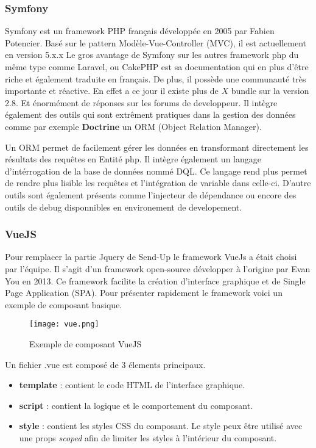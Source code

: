 \subsubsection{Symfony}
Symfony\cite{symfony} est un framework PHP français développée en 2005 par Fabien Potencier. Basé sur le pattern Modèle-Vue-Controller (MVC), il est actuellement en version 5.x.x  Le gros avantage de Symfony sur les autres framework php du même type comme Laravel, ou CakePHP est sa documentation qui en plus d'être riche et également traduite en français. De plus, il possède une communauté très importante et réactive. En effet a ce jour il existe plus de $X$ bundle sur la version 2.8. Et énormément de réponses sur les forums de developpeur. Il intègre également des outils qui sont extrêment pratiques dans la gestion des données comme par exemple \textbf{Doctrine}\cite{doctrine} un ORM (Object Relation Manager).

Un ORM permet de facilement gérer les données en transformant directement les résultats des requêtes en Entité php. Il intègre également un langage d'intérrogation de la base de données nommé DQL. Ce langage rend plus permet de rendre plus lisible les requêtes et l'intégration de variable dans celle-ci. D'autre outils sont également présents comme l'injecteur de dépendance ou encore des outils de debug disponnibles en environement de developement.  


\subsubsection{VueJS}
Pour remplacer la partie Jquery de Send-Up le framework VueJs\cite{vue} a était choisi par l'équipe. Il s'agit d'un framework open-source développer à l'origine par Evan You en 2013. Ce framework facilite la création d'interface graphique et de Single Page Application (SPA). Pour présenter rapidement le framework voici un exemple de composant basique. 

\begin{figure}[htbp]
    \center
    \texttt{[image: vue.png]}
    \caption{Exemple de composant VueJS}
\end{figure}

Un fichier .vue est composé de 3 élements principaux.
\begin{itemize}
    \item \textbf{template} : contient le code HTML de l'interface graphique.
    \item \textbf{script} : contient la logique et le comportement du composant. 
    \item \textbf{style} : contient les styles CSS du composant. Le style peux être utilisé avec une props \textit{scoped} afin de limiter les styles à l'intérieur du composant.
\end{itemize}

